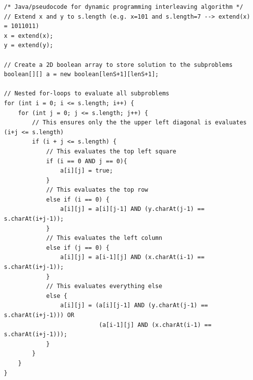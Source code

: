 \documentclass[11pt]{article}
\begin{document}
\begin{lstlisting}
/* Java/pseudocode for dynamic programming interleaving algorithm */
// Extend x and y to s.length (e.g. x=101 and s.length=7 --> extend(x) = 1011011)
x = extend(x);
y = extend(y);

// Create a 2D boolean array to store solution to the subproblems
boolean[][] a = new boolean[lenS+1][lenS+1];

// Nested for-loops to evaluate all subproblems
for (int i = 0; i <= s.length; i++) {
	for (int j = 0; j <= s.length; j++) {
		// This ensures only the the upper left diagonal is evaluates (i+j <= s.length)
		if (i + j <= s.length) {
			// This evaluates the top left square
			if (i == 0 AND j == 0){
				a[i][j] = true;
			} 
			// This evaluates the top row
			else if (i == 0) {
				a[i][j] = a[i][j-1] AND (y.charAt(j-1) == s.charAt(i+j-1));
			} 
			// This evaluates the left column
			else if (j == 0) {
				a[i][j] = a[i-1][j] AND (x.charAt(i-1) == s.charAt(i+j-1));
			} 
			// This evaluates everything else
			else {
				a[i][j] = (a[i][j-1] AND (y.charAt(j-1) == s.charAt(i+j-1))) OR
				           (a[i-1][j] AND (x.charAt(i-1) == s.charAt(i+j-1)));
			}
		}
	}
}
\end{lstlisting}
\end{document}
